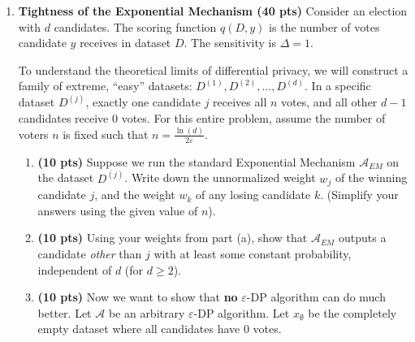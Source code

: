 \documentclass[12pt]{article}
\begin{document}
\begin{enumerate}
\begin{solution}
\begin{enumerate}
    Now, verify the $(p,q)$ bounds using $p=0$, $q=0.5$, $e^\epsilon=2$, and $\delta=0.5$:
    \begin{align*}
        q + p e^\epsilon &= 0.5 + 0(2) = 0.5 \\
        1 - \delta &= 1 - 0.5 = 0.5
    \end{align*}
    Since $0.5 \ge 0.5$, the bound $q + p e^\epsilon \ge 1 - \delta$ holds perfectly.
\end{enumerate}
\end{solution}



\begin{problem}
    \newpage
    {\bf extra sheet}
    \newpage
\end{problem}

\item {\bf Tightness of the Exponential Mechanism (40 pts)}
Consider an election with $d$ candidates.
The scoring function $q(D, y)$ is the number of votes candidate $y$ receives in dataset $D$.
The sensitivity is $\Delta = 1$.

To understand the theoretical limits of differential privacy, we will construct a family of extreme, ``easy'' datasets:
$D^{(1)}, D^{(2)}, \dots, D^{(d)}$.
In a specific dataset $D^{(j)}$, exactly one candidate $j$ receives all $n$ votes,
and all other $d-1$ candidates receive $0$ votes. 
For this entire problem, assume the number of voters $n$ is fixed such that
$n = \frac{\ln(d)}{2\varepsilon}$.

\begin{enumerate}
    \item[(a)] \textbf{(10 pts)} Suppose we run the standard Exponential Mechanism $\mathcal{A}_{EM}$ on the dataset $D^{(j)}$. Write down the unnormalized weight $w_j$ of the winning candidate $j$, and the weight $w_k$ of any losing candidate $k$. (Simplify your answers using the given value of $n$).
    
    \item[(b)] \textbf{(10 pts)} Using your weights from part (a), show that $\mathcal{A}_{EM}$ outputs a candidate \textit{other} than $j$ with at least some constant probability, independent of $d$ (for $d \ge 2$). 
    
    \item[(c)] \textbf{(10 pts)} Now we want to show that \textbf{no} $\varepsilon$-DP algorithm can do much better. Let $\mathcal{A}$ be an arbitrary $\varepsilon$-DP algorithm. Let $x_{\emptyset}$ be the completely empty dataset where all candidates have $0$ votes. 
    

\end{enumerate}
\end{enumerate}
\end{document}
